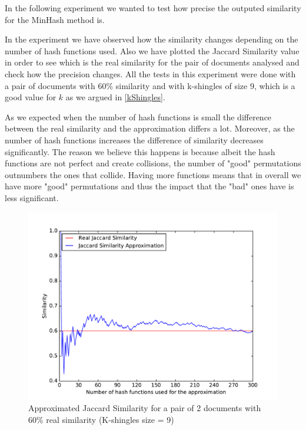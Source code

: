 \documentclass[12pt]{article}
\begin{document}
In the following experiment we wanted to test how precise the outputed similarity for the MinHash method is. 

\bigskip
In the experiment we have observed how the similarity changes depending on the number of hash functions used. Also we have plotted the Jaccard Similarity value in order to see which is the real similarity for the pair of documents analysed and check how the precision changes. 
All the tests in this experiment were done with a pair of documents with 60\% similarity and with k-shingles of size 9, which is a good value for $k$ as we argued in \autoref{kShingles}. 

\bigskip
As we expected when the number of hash functions is small the difference between the real similarity and the approximation differs a lot. Moreover, as the number of hash functions increases the difference of similarity decreases significantly.  The reason we believe this happens is because albeit the hash functions are not perfect and create collisions, the number of "good" permutations outnumbers the ones that collide. Having more functions means that in overall we have more "good" permutations and thus the impact that the "bad" ones have is less significant.


\begin{figure}[H]
	\centering
	\includegraphics[scale=0.55]{graphs/JaccardSimilarityVsApproximation.pdf}
	\caption{Approximated Jaccard Similarity for a pair of 2 documents with 60\% real similarity (K-shingles size = 9)}
	\label{fig:JaccardVsApprox}
\end{figure}
\end{document}
